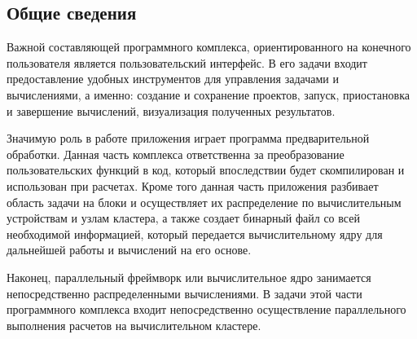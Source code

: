 \documentclass[a4paper, 14pt]{extarticle}
\theoremstyle{definition}
\begin{document}
\subsection{Общие сведения}

\par Важной составляющей программного комплекса, ориентированного на конечного пользователя является пользовательский интерфейс. В его задачи входит предоставление удобных инструментов для управления задачами и вычислениями, а именно: создание и сохранение проектов, запуск, приостановка и завершение вычислений, визуализация полученных результатов.

\par Значимую роль в работе приложения играет программа предварительной обработки. Данная часть комплекса ответственна за преобразование пользовательских функций в код, который впоследствии будет скомпилирован и использован при расчетах. Кроме того данная часть приложения разбивает область задачи на блоки и осуществляет их распределение по вычислительным устройствам и узлам кластера, а также создает бинарный файл со всей необходимой информацией, который передается вычислительному ядру для дальнейшей работы и вычислений на его основе.

\par Наконец, параллельный фреймворк или вычислительное ядро занимается непосредственно распределенными вычислениями. В задачи этой части программного комплекса входит непосредственно осуществление параллельного выполнения расчетов на вычислительном кластере.



\end{document}
